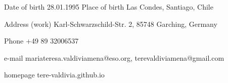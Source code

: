 \vspace{10pt}


\begin{cvskills}
	
	\cvskill
	{Date of birth} %
	{28.01.1995} %
	\cvskill
	{Place of birth} %
	{Las Condes, Santiago, Chile} %
	
	\cvskill
	{Address (work)} %
	{Karl-Schwarzschild-Str. 2, 85748 Garching, Germany} %
	
	\cvskill
	{Phone} %
	{+49 89 32006537} %
	
	\cvskill
	{e-mail} %
	{mariateresa.valdiviamena@eso.org, terevaldiviamena@gmail.com} %
	
	\cvskill
	{homepage} %
	{tere-valdivia.github.io} %
	
\end{cvskills}